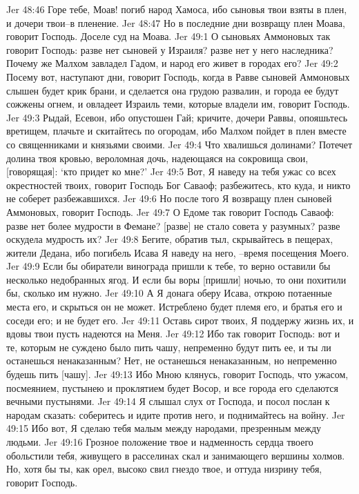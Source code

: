 Jer 48:46  Горе тебе, Моав! погиб народ Хамоса, ибо сыновья твои взяты в плен, и дочери твои--в пленение.
Jer 48:47  Но в последние дни возвращу плен Моава, говорит Господь. Доселе суд на Моава.
Jer 49:1  О сыновьях Аммоновых так говорит Господь: разве нет сыновей у Израиля? разве нет у него наследника? Почему же Малхом завладел Гадом, и народ его живет в городах его?
Jer 49:2  Посему вот, наступают дни, говорит Господь, когда в Равве сыновей Аммоновых слышен будет крик брани, и сделается она грудою развалин, и города ее будут сожжены огнем, и овладеет Израиль теми, которые владели им, говорит Господь.
Jer 49:3  Рыдай, Есевон, ибо опустошен Гай; кричите, дочери Раввы, опояшьтесь вретищем, плачьте и скитайтесь по огородам, ибо Малхом пойдет в плен вместе со священниками и князьями своими.
Jer 49:4  Что хвалишься долинами? Потечет долина твоя кровью, вероломная дочь, надеющаяся на сокровища свои, [говорящая]: `кто придет ко мне?'
Jer 49:5  Вот, Я наведу на тебя ужас со всех окрестностей твоих, говорит Господь Бог Саваоф; разбежитесь, кто куда, и никто не соберет разбежавшихся.
Jer 49:6  Но после того Я возвращу плен сыновей Аммоновых, говорит Господь.
Jer 49:7  О Едоме так говорит Господь Саваоф: разве нет более мудрости в Фемане? [разве] не стало совета у разумных? разве оскудела мудрость их?
Jer 49:8  Бегите, обратив тыл, скрывайтесь в пещерах, жители Дедана, ибо погибель Исава Я наведу на него, --время посещения Моего.
Jer 49:9  Если бы обиратели винограда пришли к тебе, то верно оставили бы несколько недобранных ягод. И если бы воры [пришли] ночью, то они похитили бы, сколько им нужно.
Jer 49:10  А Я донага оберу Исава, открою потаенные места его, и скрыться он не может. Истреблено будет племя его, и братья его и соседи его; и не будет его.
Jer 49:11  Оставь сирот твоих, Я поддержу жизнь их, и вдовы твои пусть надеются на Меня.
Jer 49:12  Ибо так говорит Господь: вот и те, которым не суждено было пить чашу, непременно будут пить ее, и ты ли останешься ненаказанным? Нет, не останешься ненаказанным, но непременно будешь пить [чашу].
Jer 49:13  Ибо Мною клянусь, говорит Господь, что ужасом, посмеянием, пустынею и проклятием будет Восор, и все города его сделаются вечными пустынями.
Jer 49:14  Я слышал слух от Господа, и посол послан к народам сказать: соберитесь и идите против него, и поднимайтесь на войну.
Jer 49:15  Ибо вот, Я сделаю тебя малым между народами, презренным между людьми.
Jer 49:16  Грозное положение твое и надменность сердца твоего обольстили тебя, живущего в расселинах скал и занимающего вершины холмов. Но, хотя бы ты, как орел, высоко свил гнездо твое, и оттуда низрину тебя, говорит Господь.
